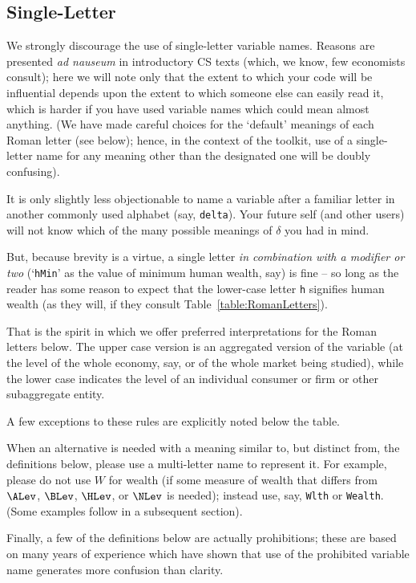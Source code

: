 \documentclass[12pt]{econtex}
\begin{document}
\subsection{Single-Letter}

We strongly discourage the use of single-letter variable names.  Reasons are presented \textit{ad nauseum} in introductory CS texts (which, we know, few economists consult); here we will note only that the extent to which your code will be influential depends upon the extent to which someone else can easily read it, which is harder if you have used variable names which could mean almost anything.  (We have made careful choices for the `default' meanings of each Roman letter (see below); hence, in the context of the toolkit, use of a single-letter name for any meaning other than the designated one will be doubly confusing).

It is only slightly less objectionable to name a variable after a familiar letter in another commonly used alphabet (say, \texttt{delta}).  Your future self (and other users) will not know which of the many possible meanings of $\delta$ you had in mind.

But, because brevity is a virtue, a single letter \textit{in combination with a modifier or two} (`\texttt{hMin}' as the value of minimum human wealth, say) is fine -- so long as the reader has some reason to expect that the lower-case letter \texttt{h} signifies human wealth (as they will, if they consult Table~\ref{table:RomanLetters}).

That is the spirit in which we offer preferred interpretations for the Roman letters below.  The upper case version is an aggregated version of the variable (at the level of the whole economy, say, or of the whole market being studied), while the lower case indicates the level of an individual consumer or firm or other subaggregate entity.  

A few exceptions to these rules are explicitly noted below the table.

When an alternative is needed with a meaning similar to, but distinct from, the definitions below, please use a multi-letter name to represent it.  For example, please do not use $W$ for wealth (if some measure of wealth that differs from $\ALev$, $\BLev$, $\HLev$, or $\NLev$ is needed); instead use, say, \texttt{Wlth} or \texttt{Wealth}.  (Some examples follow in a subsequent section).

Finally, a few of the definitions below are actually prohibitions; these are based on many years of experience which have shown that use of the prohibited variable name generates more confusion than clarity.  
\end{document}
